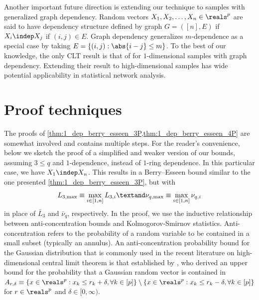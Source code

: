 \documentclass[aos]{imsart}
\begin{document}
Another important future direction is extending our technique to samples with generalized graph dependency. Random vectors $X_1, X_2, \dots, X_n \in \reals^p$ are said to have dependency structure defined by graph $G = ([n], E)$ if $X_i \indep X_j$ if $(i,j) \in E$. Graph dependency generalizes $m$-dependence as a special case by taking $E = \{(i,j): \abs{i-j} \leq m\}$. To the best of our knowledge, the only CLT result is that of \citet{chen2004normal} for $1$-dimensional samples with graph dependency. Extending their result to high-dimensional samples has wide potential applicability in statistical network analysis.

\section{Proof techniques} \label{sec:pf_sketch}

The proofs of \cref{thm:1_dep_berry_esseen_3P,thm:1_dep_berry_esseen_4P} are  somewhat involved and contains multiple steps. For the reader's convenience, below we sketch the proof of a simplified and weaker version of our bounds, assuming  $3 \leq q$ and $1$-dependence, instead of $1$-ring dependence. In this particular case, we have $X_1 \indep X_n$. This results in a  Berry--Esseen bound similar to the one presented \cref{thm:1_dep_berry_esseen_3P}, but with
\begin{equation*}
    L_{3,\max} \equiv \max_{i \in [1,n]} L_{3,i} 
    \textand
    \nu_{q,\max} \equiv \max_{i \in [1,n]} \nu_{q,i}
\end{equation*}
in place of $\bar{L}_3$ and $\bar{\nu}_q$, respectively.
In the proof, we use the inductive relationship between anti-concentration bounds and Kolmogorov-Smirnov statistics. Anti-concentration refers to the probability of a random variable to be contained in a small subset (typically an annulus). 
An anti-concentration probability bound for the Gaussian distribution that is commonly used in the recent literature on high-dimensional central limit theorem is that established by 
\citet{nazarov2003maximal} \citep[see also][]{chernozhukov2017detailed}, who derived an upper bound for the probability that a Gaussian random vector is contained in
$A_{r,\delta} \equiv \{x \in \reals^p: x_k \leq r_k + \delta, \forall k \in [p]\}
\setminus \{x \in \reals^p: x_k \leq r_k - \delta, \forall k \in [p]\}$
for $r \in \reals^p$ and $\delta \in [0, \infty)$.
\end{document}
